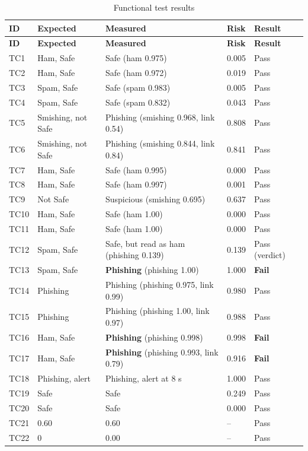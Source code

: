 {{\small{}
\begin{longtable}{|p{1.1cm}|p{4.2cm}|p{4.0cm}|p{1.3cm}|p{1.9cm}|}
\caption{Functional test results}\label{tab:ftres}\\
\hline \textbf{ID} & \textbf{Expected} & \textbf{Measured} & \textbf{Risk} & \textbf{Result} \\ \hline
\endfirsthead
\hline \textbf{ID} & \textbf{Expected} & \textbf{Measured} & \textbf{Risk} & \textbf{Result} \\ \hline
\endhead
\hline
\endfoot
TC1 & Ham, Safe & Safe (ham 0.975) & 0.005 & Pass \\ \hline
TC2 & Ham, Safe & Safe (ham 0.972) & 0.019 & Pass \\ \hline
TC3 & Spam, Safe & Safe (spam 0.983) & 0.005 & Pass \\ \hline
TC4 & Spam, Safe & Safe (spam 0.832) & 0.043 & Pass \\ \hline
TC5 & Smishing, not Safe & Phishing (smishing 0.968, link 0.54) & 0.808 & Pass \\ \hline
TC6 & Smishing, not Safe & Phishing (smishing 0.844, link 0.84) & 0.841 & Pass \\ \hline
TC7 & Ham, Safe & Safe (ham 0.995) & 0.000 & Pass \\ \hline
TC8 & Ham, Safe & Safe (ham 0.997) & 0.001 & Pass \\ \hline
TC9 & Not Safe & Suspicious (smishing 0.695) & 0.637 & Pass \\ \hline
TC10 & Ham, Safe & Safe (ham 1.00) & 0.000 & Pass \\ \hline
TC11 & Ham, Safe & Safe (ham 1.00) & 0.000 & Pass \\ \hline
TC12 & Spam, Safe & Safe, but read as ham (phishing 0.139) & 0.139 & Pass (verdict) \\ \hline
TC13 & Spam, Safe & \textbf{Phishing} (phishing 1.00) & 1.000 & \textbf{Fail} \\ \hline
TC14 & Phishing & Phishing (phishing 0.975, link 0.99) & 0.980 & Pass \\ \hline
TC15 & Phishing & Phishing (phishing 1.00, link 0.97) & 0.988 & Pass \\ \hline
TC16 & Ham, Safe & \textbf{Phishing} (phishing 0.998) & 0.998 & \textbf{Fail} \\ \hline
TC17 & Ham, Safe & \textbf{Phishing} (phishing 0.993, link 0.79) & 0.916 & \textbf{Fail} \\ \hline
TC18 & Phishing, alert & Phishing, alert at 8 s & 1.000 & Pass \\ \hline
TC19 & Safe & Safe & 0.249 & Pass \\ \hline
TC20 & Safe & Safe & 0.000 & Pass \\ \hline
TC21 & 0.60 & 0.60 & -- & Pass \\ \hline
TC22 & 0 & 0.00 & -- & Pass \\ \hline
\end{longtable}
}

}
